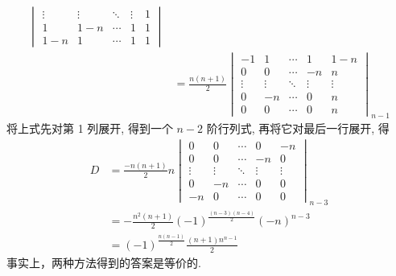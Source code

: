 \begin{enumerate}
\begin{enumerate}
\begin{enumerate}
\begin{align*}
\begin{vmatrix}
                                      \vdots & \vdots & \ddots & \vdots & 1   \\
                                      1      & 1-n    & \cdots & 1      & 1   \\
                                      1-n    & 1      & \cdots & 1      & 1
                                  \end{vmatrix}                         \\
                                    & =\frac{n(n+1)}{2}\begin{vmatrix}
                                                           -1     & 1      & \cdots & 1      & 1-n    \\
                                                           0      & 0      & \cdots & -n     & n      \\
                                                           \vdots & \vdots & \ddots & \vdots & \vdots \\
                                                           0      & -n     & \cdots & 0      & n      \\
                                                           0      & 0      & \cdots & 0      & n
                                                       \end{vmatrix}_{n-1}
                              \end{align*}
                              将上式先对第 1 列展开, 得到一个 $n-2$ 阶行列式, 再将它对最后一行展开, 得
                              \begin{align*}
                                  D & =\frac{-n(n+1)}{2} n
                                  \begin{vmatrix}
                                      0      & 0      & \cdots & 0      & -n     \\
                                      0      & 0      & \cdots & -n     & 0      \\
                                      \vdots & \vdots & \ddots & \vdots & \vdots \\
                                      0      & -n     & \cdots & 0      & 0      \\
                                      -n     & 0      & \cdots & 0      & 0
                                  \end{vmatrix}_{n-3}                      \\
                                    & =-\frac{n^{2}(n+1)}{2}(-1)^{\frac{(n-3)(n-4)}{2}}(-n)^{n-3} \\
                                    & =(-1)^{\frac{n(n-1)}{2} }\frac{(n+1) n^{n-1}}{2}
                              \end{align*}
                              事实上，两种方法得到的答案是等价的.
                    \end{enumerate}
          \end{enumerate}


\end{enumerate}
